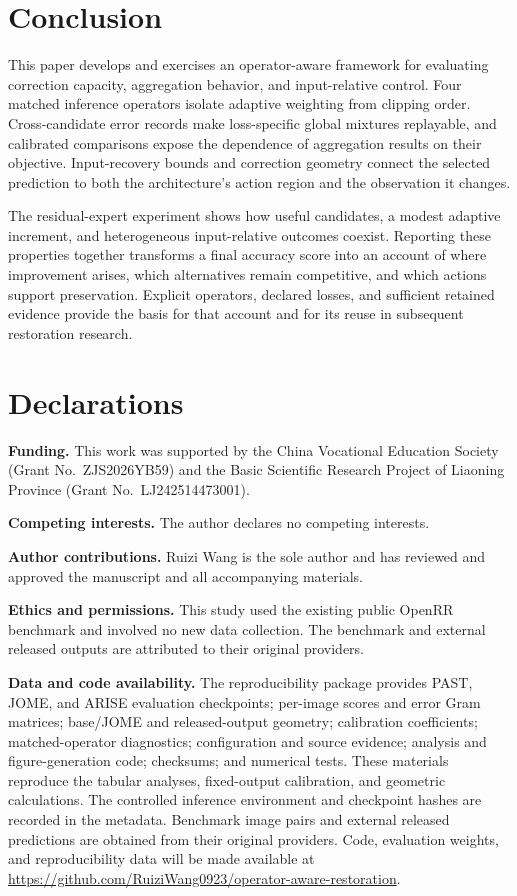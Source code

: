 \documentclass[12pt]{article}
\begin{document}
\section{Conclusion}
This paper develops and exercises an operator-aware framework for evaluating correction capacity, aggregation behavior, and input-relative control. Four matched inference operators isolate adaptive weighting from clipping order. Cross-candidate error records make loss-specific global mixtures replayable, and calibrated comparisons expose the dependence of aggregation results on their objective. Input-recovery bounds and correction geometry connect the selected prediction to both the architecture's action region and the observation it changes.

The residual-expert experiment shows how useful candidates, a modest adaptive increment, and heterogeneous input-relative outcomes coexist. Reporting these properties together transforms a final accuracy score into an account of where improvement arises, which alternatives remain competitive, and which actions support preservation. Explicit operators, declared losses, and sufficient retained evidence provide the basis for that account and for its reuse in subsequent restoration research.

\section*{Declarations}
\noindent\textbf{Funding.} This work was supported by the China Vocational Education Society (Grant No.\ ZJS2026YB59) and the Basic Scientific Research Project of Liaoning Province (Grant No.\ LJ242514473001).

\noindent\textbf{Competing interests.} The author declares no competing interests.

\noindent\textbf{Author contributions.} Ruizi Wang is the sole author and has reviewed and approved the manuscript and all accompanying materials.

\noindent\textbf{Ethics and permissions.} This study used the existing public OpenRR benchmark and involved no new data collection. The benchmark and external released outputs are attributed to their original providers.

\noindent\textbf{Data and code availability.} The reproducibility package provides PAST, JOME, and ARISE evaluation checkpoints; per-image scores and error Gram matrices; base/JOME and released-output geometry; calibration coefficients; matched-operator diagnostics; configuration and source evidence; analysis and figure-generation code; checksums; and numerical tests. These materials reproduce the tabular analyses, fixed-output calibration, and geometric calculations. The controlled inference environment and checkpoint hashes are recorded in the metadata. Benchmark image pairs and external released predictions are obtained from their original providers. Code, evaluation weights, and reproducibility data will be made available at \url{https://github.com/RuiziWang0923/operator-aware-restoration}.
\end{document}
